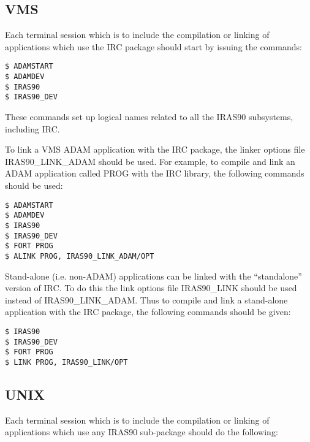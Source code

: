 \subsection{VMS}
Each terminal session which is to include the compilation or linking of 
applications which use the IRC package should start by issuing the commands:

\begin{verbatim}
$ ADAMSTART
$ ADAMDEV
$ IRAS90
$ IRAS90_DEV
\end{verbatim}

These commands set up logical names related to all the IRAS90
subsystems, including IRC. 

To link a VMS ADAM application with the IRC package, the linker options file
IRAS90\_LINK\_ADAM should be used. For example, to compile and link an ADAM
application called PROG with the IRC library, the following commands should be
used: 

\begin{verbatim}
$ ADAMSTART
$ ADAMDEV
$ IRAS90
$ IRAS90_DEV
$ FORT PROG
$ ALINK PROG, IRAS90_LINK_ADAM/OPT 
\end{verbatim}

Stand-alone (i.e. non-ADAM) applications can be linked with the ``standalone''
version of IRC. To do this the link options file IRAS90\_LINK should be used
instead of IRAS90\_LINK\_ADAM. Thus to compile and link a stand-alone
application with the IRC package, the following commands should be given: 

\begin{verbatim}
$ IRAS90
$ IRAS90_DEV
$ FORT PROG
$ LINK PROG, IRAS90_LINK/OPT 
\end{verbatim}

\subsection{UNIX}

Each terminal session which is to include the compilation or linking of 
applications which use any IRAS90 sub-package should do the following:

